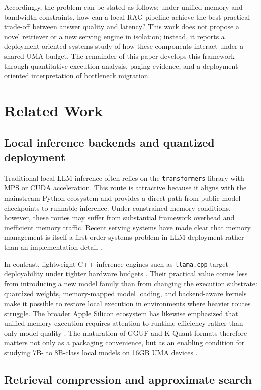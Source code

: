\documentclass[10pt,twocolumn]{article}
\begin{document}
Accordingly, the problem can be stated as follows: under unified-memory and bandwidth constraints, how can a local RAG pipeline achieve the best practical trade-off between answer quality and latency? This work does not propose a novel retriever or a new serving engine in isolation; instead, it reports a deployment-oriented systems study of how these components interact under a shared UMA budget. The remainder of this paper develops this framework through quantitative execution analysis, paging evidence, and a deployment-oriented interpretation of bottleneck migration.

\section{Related Work}

\subsection{Local inference backends and quantized deployment}

Traditional local LLM inference often relies on the \texttt{transformers} library with MPS or CUDA acceleration. This route is attractive because it aligns with the mainstream Python ecosystem and provides a direct path from public model checkpoints to runnable inference. Under constrained memory conditions, however, these routes may suffer from substantial framework overhead and inefficient memory traffic. Recent serving systems have made clear that memory management is itself a first-order systems problem in LLM deployment rather than an implementation detail \cite{kwon2023vllm}.

In contrast, lightweight C++ inference engines such as \texttt{llama.cpp} target deployability under tighter hardware budgets \cite{ggml2026llamacpp}. Their practical value comes less from introducing a new model family than from changing the execution substrate: quantized weights, memory-mapped model loading, and backend-aware kernels make it possible to restore local execution in environments where heavier routes struggle. The broader Apple Silicon ecosystem has likewise emphasized that unified-memory execution requires attention to runtime efficiency rather than only model quality \cite{hannun2023mlx}. The maturation of GGUF and K-Quant formats therefore matters not only as a packaging convenience, but as an enabling condition for studying 7B- to 8B-class local models on 16GB UMA devices \cite{ggml2026gguf}.

\subsection{Retrieval compression and approximate search}
\end{document}
